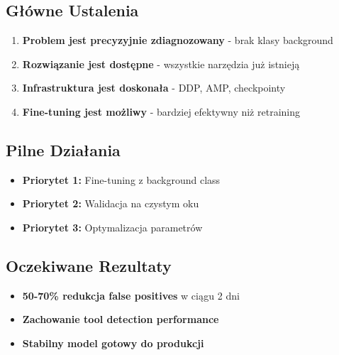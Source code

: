\documentclass[12pt,a4paper]{article}
\begin{document}
\subsection{Główne Ustalenia}

\begin{enumerate}
    \item \textbf{Problem jest precyzyjnie zdiagnozowany} - brak klasy background
    \item \textbf{Rozwiązanie jest dostępne} - wszystkie narzędzia już istnieją
    \item \textbf{Infrastruktura jest doskonała} - DDP, AMP, checkpointy
    \item \textbf{Fine-tuning jest możliwy} - bardziej efektywny niż retraining
\end{enumerate}

\subsection{Pilne Działania}

\begin{itemize}
    \item \textbf{Priorytet 1:} Fine-tuning z background class
    \item \textbf{Priorytet 2:} Walidacja na czystym oku
    \item \textbf{Priorytet 3:} Optymalizacja parametrów
\end{itemize}

\subsection{Oczekiwane Rezultaty}

\begin{itemize}
    \item \textbf{50-70\% redukcja false positives} w ciągu 2 dni
    \item \textbf{Zachowanie tool detection performance}
    \item \textbf{Stabilny model gotowy do produkcji}
\end{itemize}
\end{document}
